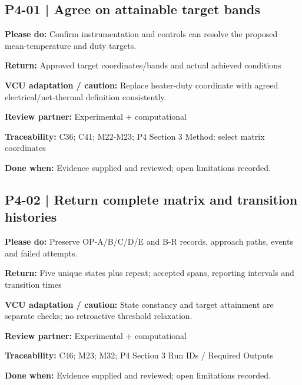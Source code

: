 \documentclass[11pt]{article}
\begin{document}
\par\noindent\begin{minipage}{\textwidth}\small\setlength{\parskip}{2pt}
\subsection*{P4-01 | Agree on attainable target bands}
\textbf{Please do:} Confirm instrumentation and controls can resolve the proposed mean-temperature and duty targets.\par
\textbf{Return:} Approved target coordinates/bands and actual achieved conditions\par
\textbf{VCU adaptation / caution:} Replace heater-duty coordinate with agreed electrical/net-thermal definition consistently.\par
\textbf{Review partner:} Experimental + computational\par
\textbf{Traceability:} C36; C41; M22-M23; P4 Section 3 Method: select matrix coordinates\par
\textbf{Done when:} Evidence supplied and reviewed; open limitations recorded.\par
\end{minipage}\par\vspace{8pt}
\par\noindent\begin{minipage}{\textwidth}\small\setlength{\parskip}{2pt}
\subsection*{P4-02 | Return complete matrix and transition histories}
\textbf{Please do:} Preserve OP-A/B/C/D/E and B-R records, approach paths, events and failed attempts.\par
\textbf{Return:} Five unique states plus repeat; accepted spans, reporting intervals and transition times\par
\textbf{VCU adaptation / caution:} State constancy and target attainment are separate checks; no retroactive threshold relaxation.\par
\textbf{Review partner:} Experimental + computational\par
\textbf{Traceability:} C46; M23; M32; P4 Section 3 Run IDs / Required Outputs\par
\textbf{Done when:} Evidence supplied and reviewed; open limitations recorded.\par
\end{minipage}\par\vspace{8pt}
\end{document}
